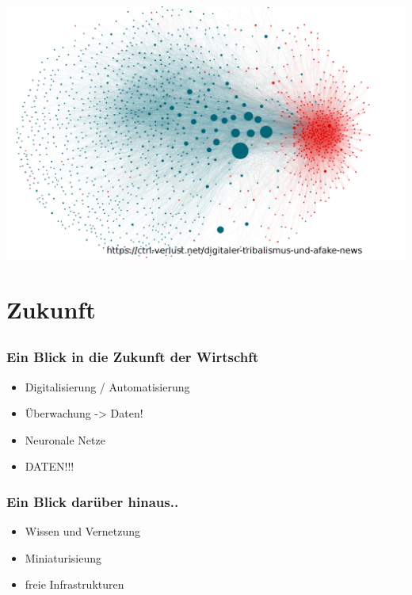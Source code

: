 \documentclass[12pt]{beamer}
\begin{document}
\begin{frame}
\begin{itemize}
{\begin{minipage}{\linewidth}
          \centering
          \includegraphics[height=0.5\textheight]{img//digitaler_Tribalismus_Terrorwarnstufe_Schweden.png}
      \end{minipage}
    }      
  \end{itemize}		
\end{frame}

\section{Zukunft}
  \subsection{}
  
\begin{frame}
	\frametitle{Ein Blick in die Zukunft der Wirtschft}
	\begin{itemize}
		\item<4-> Digitalisierung / Automatisierung
    \item<1-> Überwachung -> Daten!
		\item<2-> Neuronale Netze
		\item<3-> DATEN!!!		
	\end{itemize}
\end{frame}

\begin{frame}
	\frametitle{Ein Blick darüber hinaus..}
	\begin{itemize}
		\item<1-> Wissen und Vernetzung
		\item<2-> Miniaturisieung
		\item<3-> freie Infrastrukturen
	\end{itemize}
\end{frame}
\end{document}
